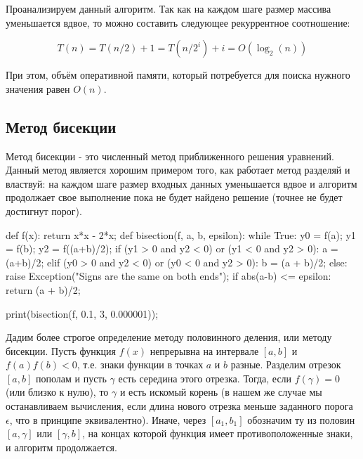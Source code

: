 Проанализируем данный алгоритм. Так как на каждом шаге 
размер массива уменьшается вдвое, то можно составить следующее 
рекуррентное соотношение:

$$T(n) = T(n/2) + 1 = T(n/2^i) + i = O(\log_2(n))$$

При этом, объём оперативной памяти, который потребуется 
для поиска нужного значения равен $O(n)$. 

\subsection{Метод бисекции}

Метод бисекции - это численный метод приближенного решения уравнений.
Данный метод является хорошим примером того, как работает метод разделяй и властвуй:
на каждом шаге размер входных данных уменьшается вдвое и алгоритм продолжает 
свое выполнение пока не будет найдено решение (точнее не будет достигнут 
порог). 

\begin{python}
def f(x):
	return x*x - 2*x;
def bisection(f, a, b, epsilon):
	while True:
		y0 = f(a);
		y1 = f(b);
		y2 = f((a+b)/2);
		if (y1 > 0 and y2 < 0) or (y1 < 0 and y2 > 0):
			a = (a+b)/2;
		elif (y0 > 0 and y2 < 0) or (y0 < 0 and y2 > 0):
			b = (a + b)/2;
		else:
			raise Exception("Signs are the same on both ends");
		if abs(a-b) <= epsilon:
			return (a + b)/2;

print(bisection(f, 0.1, 3, 0.000001));
\end{python}

Дадим более строгое определение методу половинного 
деления, или методу бисекции. Пусть функция $f(x)$ непрерывна
на интервале $[a, b]$ и $f(a)f(b)<0$, т.е. знаки функции
в точках $a$ и $b$ разные. Разделим отрезок $[a, b]$ пополам
и пусть $\gamma$ есть середина этого отрезка. Тогда, если
$f(\gamma) = 0$ (или близко к нулю), то $\gamma$ и есть
искомый корень (в нашем же случае мы останавливаем вычисления,
если длина нового отрезка меньше заданного порога $\epsilon$, что в принципе
эквивалентно). Иначе, через $[a_1, b_1]$ обозначим ту из половин
$[a, \gamma]$ или $[\gamma, b]$, на концах которой функция имеет
противоположенные знаки, и алгоритм продолжается.


